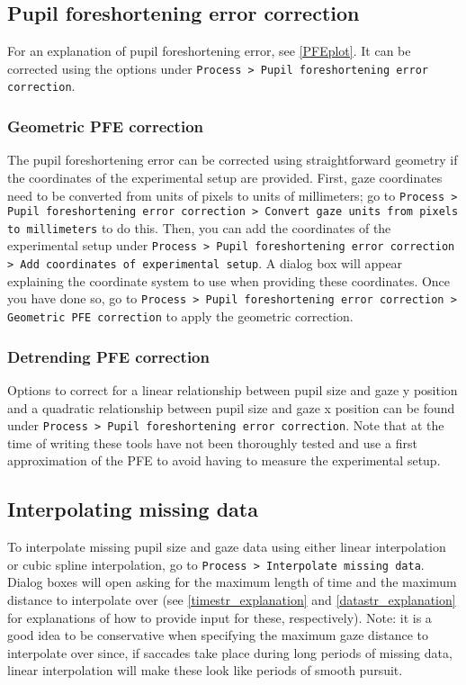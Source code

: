 \documentclass{article}
\begin{document}
\subsection{Pupil foreshortening error correction} \label{PFEcorrection}
For an explanation of pupil foreshortening error, see \ref{PFEplot}. It can be corrected using the options under \texttt{Process > Pupil foreshortening error correction}.
\subsubsection{Geometric PFE correction} \label{coords_explanation}
The pupil foreshortening error can be corrected using straightforward geometry if the coordinates of the experimental setup are provided. First, gaze coordinates need to be converted from units of pixels to units of millimeters; go to \texttt{Process > Pupil foreshortening error correction > Convert gaze units from pixels to millimeters} to do this. Then, you can add the coordinates of the experimental setup under \texttt{Process > Pupil foreshortening error correction > Add coordinates of experimental setup}. A dialog box will appear explaining the coordinate system to use when providing these coordinates. Once you have done so, go to \texttt{Process > Pupil foreshortening error correction > Geometric PFE correction} to apply the geometric correction.
\subsubsection{Detrending PFE correction}
Options to correct for a linear relationship between pupil size and gaze y position and a quadratic relationship between pupil size and gaze x position can be found under \texttt{Process > Pupil foreshortening error correction}. Note that at the time of writing these tools have not been thoroughly tested and use a first approximation of the PFE to avoid having to measure the experimental setup.
\subsection{Interpolating missing data}
To interpolate missing pupil size and gaze data using either linear interpolation or cubic spline interpolation, go to \texttt{Process > Interpolate missing data}. Dialog boxes will open asking for the maximum length of time and the maximum distance to interpolate over (see \ref{timestr_explanation} and \ref{datastr_explanation} for explanations of how to provide input for these, respectively). Note: it is a good idea to be conservative when specifying the maximum gaze distance to interpolate over since, if saccades take place during long periods of missing data, linear interpolation will make these look like periods of smooth pursuit.
\end{document}
